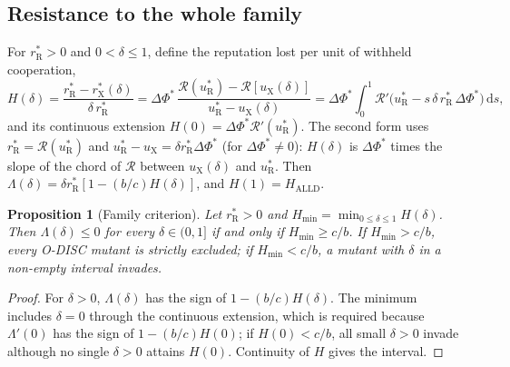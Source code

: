 \documentclass[fleqn,10pt]{article}
\theoremstyle{plain}
\newtheorem{proposition}{Proposition}
\theoremstyle{remark}
\newcommand{\Rm}{\mathcal R}
\newcommand{\ALLD}{\mathrm{ALLD}}
\newcommand{\rR}{r^*_{\mathrm R}}
\newcommand{\uR}{u^*_{\mathrm R}}
\begin{document}
\subsection{Resistance to the whole family}
For $\rR>0$ and $0<\delta\le1$, define the reputation lost per unit of withheld
cooperation,
\begin{equation}
H(\delta)=\frac{\rR-r^*_{\mathrm X}(\delta)}{\delta\,\rR}
=\Delta\Phi^*\,\frac{\Rm(\uR)-\Rm[u_{\mathrm X}(\delta)]}{\uR-u_{\mathrm X}(\delta)}
=\Delta\Phi^*\int_0^1\Rm'\bigl(\uR-s\,\delta\,\rR\,\Delta\Phi^*\bigr)\,\mathrm ds ,
\label{eq:S-H}
\end{equation}
and its continuous extension $H(0)=\Delta\Phi^*\Rm'(\uR)$. The second form uses
$\rR=\Rm(\uR)$ and $\uR-u_{\mathrm X}=\delta\rR\Delta\Phi^*$ (for $\Delta\Phi^*\ne0$):
$H(\delta)$ is $\Delta\Phi^*$ times the slope of the chord of $\Rm$ between
$u_{\mathrm X}(\delta)$ and $\uR$. Then
$\Lambda(\delta)=\delta\rR[1-(b/c)H(\delta)]$, and $H(1)=H_{\ALLD}$.

\begin{proposition}[Family criterion]\label{prop:family}
Let $\rR>0$ and $H_{\min}=\min_{0\le\delta\le1}H(\delta)$. Then
$\Lambda(\delta)\le0$ for every $\delta\in(0,1]$ if and only if
$H_{\min}\ge c/b$. If $H_{\min}>c/b$, every O-DISC mutant is strictly excluded;
if $H_{\min}<c/b$, a mutant with $\delta$ in a non-empty interval invades.
\end{proposition}
\begin{proof}
For $\delta>0$, $\Lambda(\delta)$ has the sign of $1-(b/c)H(\delta)$. The
minimum includes $\delta=0$ through the continuous extension, which is required
because $\Lambda'(0)$ has the sign of $1-(b/c)H(0)$; if $H(0)<c/b$, all small
$\delta>0$ invade although no single $\delta>0$ attains $H(0)$. Continuity of
$H$ gives the interval.
\end{proof}
\end{document}
